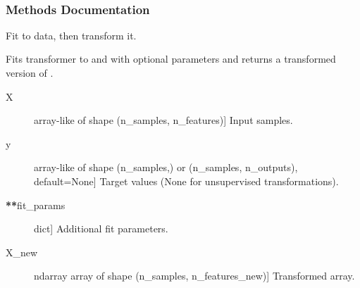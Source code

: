 \documentclass[letterpaper,10pt,english]{sphinxmanual}
\begin{document}
\begin{fulllineitems}
\begin{savenotes}
\begin{longtable}[c]{}
\\
\hline
\end{longtable}\sphinxatlongtableend\end{savenotes}
\subsubsection*{Methods Documentation}

\begin{fulllineitems}
\label{\detokenize{api/mastml.preprocessing.NoPreprocessor:mastml.preprocessing.NoPreprocessor.fit}}
\end{fulllineitems}


\begin{fulllineitems}
\label{\detokenize{api/mastml.preprocessing.NoPreprocessor:mastml.preprocessing.NoPreprocessor.fit_transform}}
Fit to data, then transform it.

Fits transformer to  and  with optional parameters 
and returns a transformed version of .
\begin{description}
\item[{X}] \leavevmode{[}array-like of shape (n\_samples, n\_features){]}
Input samples.

\item[{y}] \leavevmode{[}array-like of shape (n\_samples,) or (n\_samples, n\_outputs),                 default=None{]}
Target values (None for unsupervised transformations).

\item[{{\color{red}\bfseries{}**}fit\_params}] \leavevmode{[}dict{]}
Additional fit parameters.

\end{description}
\begin{description}
\item[{X\_new}] \leavevmode{[}ndarray array of shape (n\_samples, n\_features\_new){]}
Transformed array.


\end{description}
\end{fulllineitems}
\end{fulllineitems}
\end{document}
